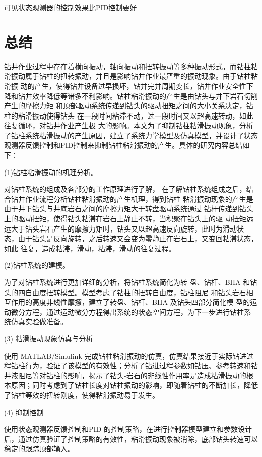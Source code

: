\documentclass[12pt,hyperref,a4paper,UTF8]{ctexart}
\begin{document}
	可见状态观测器的控制效果比PID控制要好
	
	
	\newpage
	\section{总结}
	
	钻井作业过程中存在着横向振动，轴向振动和扭转振动等多种振动形式，而钻柱粘滑振动属于钻柱的扭转振动，并且是影响钻井作业最严重的振动现象。由于钻柱粘滑振 动的产生，使得钻井设备过早损坏，钻井完井周期变长，钻井作业安全性下降和钻井效率降低等诸多不利影响。钻柱粘滑振动的产生是由钻头与井下岩石切削产生的摩擦力矩 和顶部驱动系统传递到钻头的驱动扭矩之间的大小关系决定，钻柱的粘滑振动使得钻头 在一段时间粘滞不动，过一段时间又以超高速转动，如此往复循环，对钻井作业产生极 大的影响。本文为了抑制钻柱粘滑振动现象，分析了钻柱系统粘滑振动的产生原因，建立了系统力学模型及仿真模型，并设计了状态观测器反馈控制和PID控制来抑制钻柱粘滑振动的产生。具体的研究内容总结如下：
	
	
	
	(1)钻柱粘滑振动的机理分析。
	
	对钻柱系统的组成及各部分的工作原理进行了解， 在了解钻柱系统组成之后，结合钻井作业流程分析钻柱粘滑振动的产生机理，得到钻柱 粘滑振动现象的产生是由于井下钻头与井底岩石之间的摩擦力矩大于转盘驱动系统通过 钻杆传递到钻头上的驱动扭矩，使得钻头粘滞在岩石上静止不转，当积聚在钻头上的驱 动扭矩远远大于钻头岩石产生的摩擦力矩时，钻头又以超高速反向旋转，此时为滑动状 态，由于钻头是反向旋转，之后转速又会变为零静止在岩石上，又变回粘滞状态，如此 往复，造成粘滞，滑动，粘滞，滑动的往复过程。
	
	(2)钻柱系统的建模。
	
	为了对钻柱系统进行更加详细的分析，将钻柱系统简化为转 盘、钻杆、BHA 和钻头的四自由度扭转模型。模型考虑了钻柱的扭转自由度，钻柱阻尼 和钻头岩石相互作用的高度非线性摩擦，建立了转盘、钻杆、BHA 及钻头四部分简化模 型的运动微分方程，通过运动微分方程得出系统的状态空间方程，为下一步进行钻柱系 统仿真实验做准备。
	
	(3) 粘滑振动现象仿真与分析
	
	使用 MATLAB/Simulink 完成钻柱粘滑振动的仿真，仿真结果接近于实际钻进过程钻柱行为，验证了该模型的有效性；分析了钻进过程参数如钻压、参考转速和钻井液阻尼等对钻柱的影响，揭示了钻头-岩石的非线性作用率是造成粘滑振动的根本原因；同时考虑到了钻柱长度对钻柱振动的影响，即随着钻柱的不断加长，降低了钻柱等效的扭转刚度，使得粘滑振动易于发生。
	
	(4) 抑制控制
	
	使用状态观测器反馈控制和PID 的控制策略，在进行控制器模型建立和参数设计后，通过仿真验证了控制策略的有效性，粘滑振动现象被消除，底部钻头转速可以稳定的跟踪顶部输入。
	
\end{document}
